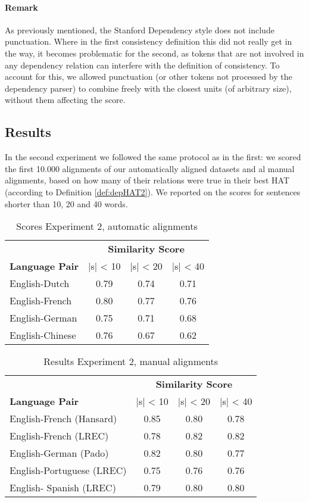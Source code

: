 \paragraph{Remark} As previously mentioned, the Stanford Dependency style does not include punctuation. Where in the first consistency definition this did not really get in the way, it becomes problematic for the second, as tokens that are not involved in any dependency relation can interfere with the definition of consistency. To account for this, we allowed punctuation (or other tokens not processed by the dependency parser) to combine freely with the closest units (of arbitrary size), without them affecting the score.

\subsection{Results}

In the second experiment we followed the same protocol as in the first: we scored the first 10.000 alignments of our automatically aligned datasets and al manual alignments, based on how many of their relations were true in their best HAT (according to Definition \ref{def:depHAT2}). We reported on the scores for sentences shorter than 10, 20 and 40 words.

\begin{table}[!ht]
\centering
\begin{tabular}{|l|c|c|c|}
\hline
&\multicolumn{3}{c|}{\textbf{Similarity Score}}\\
\textbf{Language Pair} & |s| < 10 & |s| < 20 & |s| < 40\\
\hline \hline
English-Dutch & 0.79 & 0.74 & 0.71 \\
\hline
English-French & 0.80 & 0.77 & 0.76\\
\hline
English-German & 0.75 & 0.71 & 0.68 \\
\hline
English-Chinese & 0.76 & 0.67 & 0.62\\
\hline
\end{tabular}
\caption{Scores Experiment 2, automatic alignments}\label{tab:scores3}
\end{table}

\begin{table}[!ht]
\centering
\begin{tabular}{|l|c|c|c|}
\hline
&\multicolumn{3}{c|}{\textbf{Similarity Score}}\\
\textbf{Language Pair} & |s| < 10 & |s| < 20 & |s| < 40\\
\hline \hline
English-French (Hansard) & 0.85 & 0.80 & 0.78 \\
\hline
English-French (LREC) & 0.78 & 0.82 & 0.82 \\
\hline
English-German (Pado) & 0.82 & 0.80 & 0.77 \\
\hline
English-Portuguese (LREC) & 0.75 & 0.76 & 0.76 \\
\hline
English- Spanish (LREC) & 0.79 & 0.80 & 0.80\\
\hline
\end{tabular}
\caption{Results Experiment 2, manual alignments}\label{tab:scores4}
\end{table}

